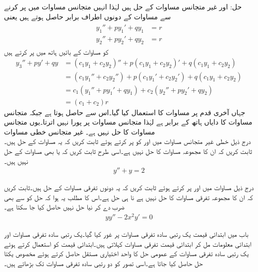 حل: اور  غیر متجانس مساوات کے حل ہیں لہٰذا انہیں متجانس مساوات میں پر کرنے سے مساوات کے دونوں اطراف برابر حاصل ہوتے ہیں یعنی
\begin{gather}
\begin{aligned}\label{مساوات_سادہ_دو_درجی_غیر_متجانس_حل_الف}
y_1''+py_1'+qy_1&=r\\
y_2''+py_2'+qy_2&=r
\end{aligned}
\end{gather}
 کو مساوات کے بائیں ہاتھ میں پر کرتے ہیں
\begin{align*}
y_3''+py'+qy&=(c_1y_1+c_2y_2)''+p(c_1y_1+c_2y_2)'+q(c_1y_1+c_2y_2)\\
&=(c_1y_1''+c_2y_2'')+p(c_1y_1'+c_2y_2')+q(c_1y_1+c_2y_2)\\
&=c_1(y_1''+py_1'+qy_1)+c_2(y_2''+py_2'+qy_2)\\
&=(c_1+c_2)r
\end{align*}
 جہاں آخری قدم پر مساوات  کا استعمال کیا گیا۔اس سے  حاصل ہوتا ہے جبکہ متجانس مساوات کا دایاں ہاتھ  کے برابر ہے لہٰذا  متجانس مساوات پر پورا نہیں اترتا۔یوں  متجانس مساوات کا حل نہیں ہے۔
\quad غیر متجانس خطی مساوات\\
درج ذیل خطی غیر متجانس مساوات میں  اور  کو پر کرتے ہوئے ثابت کریں کہ یہ مساوات کے حل ہیں۔ثابت کریں کہ ان کا مجموعہ مساوات کا حل نہیں ہے۔اسی طرح ثابت کریں کہ  یا  بھی مساوات کے حل نہیں ہیں۔
\begin{align*}
y''+y=2
\end{align*}

درج ذیل مساوات میں  اور  پر کرتے ہوئے ثابت کریں کہ یہ دونوں تفرقی مساوات کے حل ہیں۔ثابت کریں کہ ان کا مجموعہ تفرقی مساوات کا حل نہیں ہے نا ہی  حل ہے۔اس کا مطلب یہ ہوا کہ حل کو  سے بھی ضرب دے کر نیا حل نہیں حاصل کیا جا سکتا ہے۔
\begin{align*}
yy''-2x^2y'=0
\end{align*}

باب  میں ابتدائی قیمت یک رتبی سادہ تفرقی مساوات پر غور کیا گیا۔یک رتبی سادہ تفرقی مساوات اور ابتدائی معلومات  مل کر ابتدائی قیمت تفرقی مساوات کہلاتی ہیں۔ابتدائی قیمت کو استعمال کرتے ہوئے یک رتبی سادہ تفرقی مساوات کے عمومی حل کا واحد اختیاری مستقل  حاصل کرتے ہوئے مخصوص یکتا حل حاصل کیا جاتا ہے۔اسی تصور کو دو رتبی سادہ تفرقی مساوات تک بڑھاتے ہیں۔

